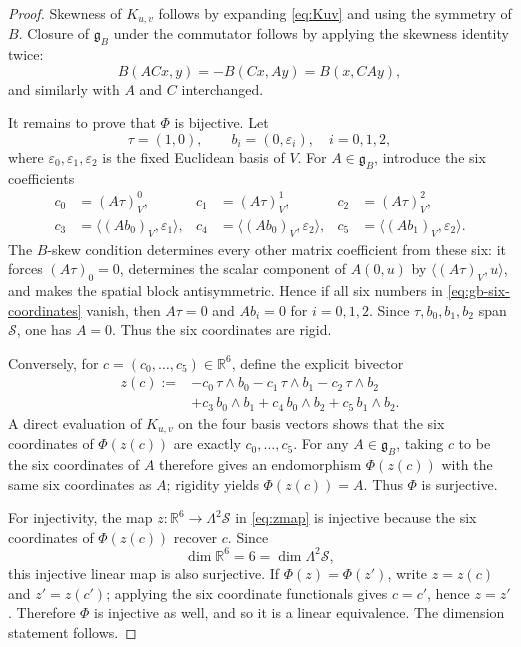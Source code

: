 \documentclass[11pt,a4paper]{article}
\theoremstyle{definition}
\theoremstyle{remark}
\newcommand{\R}{\mathbb{R}}
\newcommand{\Smodel}{\mathcal{S}}
\newcommand{\gB}{\mathfrak{g}_{B}}
\begin{document}
\begin{proof}
Skewness of \(K_{u,v}\) follows by expanding \eqref{eq:Kuv} and using the
symmetry of \(B\).  Closure of \(\gB\) under the commutator follows by
applying the skewness identity twice:
\[
  B(ACx,y)=-B(Cx,Ay)=B(x,CAy),
\]
and similarly with \(A\) and \(C\) interchanged.

It remains to prove that \(\Phi\) is bijective.  Let
\[
   \tau=(1,0),
   \qquad
   b_i=(0,\varepsilon_i),\quad i=0,1,2,
\]
where \(\varepsilon_0,\varepsilon_1,\varepsilon_2\) is the fixed Euclidean
basis of \(V\).  For \(A\in\gB\), introduce the six coefficients
\[
\begin{aligned}
   c_0&=(A\tau)_V^{0},&
   c_1&=(A\tau)_V^{1},&
   c_2&=(A\tau)_V^{2},\\
   c_3&=\langle (Ab_0)_V,\varepsilon_1\rangle,&
   c_4&=\langle (Ab_0)_V,\varepsilon_2\rangle,&
   c_5&=\langle (Ab_1)_V,\varepsilon_2\rangle.
\end{aligned}
\tag{4.6a}\label{eq:gb-six-coordinates}
\]
The \(B\)-skew condition determines every other matrix coefficient from
these six: it forces \((A\tau)_0=0\), determines the scalar component of
\(A(0,u)\) by \(\langle(A\tau)_V,u\rangle\), and makes the spatial block
antisymmetric.  Hence if all six numbers in
\eqref{eq:gb-six-coordinates} vanish, then \(A\tau=0\) and
\(Ab_i=0\) for \(i=0,1,2\).  Since \(\tau,b_0,b_1,b_2\) span
\(\Smodel\), one has \(A=0\).  Thus the six coordinates are rigid.

Conversely, for \(c=(c_0,\ldots,c_5)\in\R^6\), define the explicit
bivector
\[
\begin{aligned}
   z(c):={}&-c_0\,\tau\wedge b_0
            -c_1\,\tau\wedge b_1
            -c_2\,\tau\wedge b_2\\
          &+c_3\,b_0\wedge b_1
            +c_4\,b_0\wedge b_2
            +c_5\,b_1\wedge b_2 .
\end{aligned}
\tag{4.6b}\label{eq:zmap}
\]
A direct evaluation of \(K_{u,v}\) on the four basis vectors shows that
the six coordinates of \(\Phi(z(c))\) are exactly \(c_0,\ldots,c_5\).
For any \(A\in\gB\), taking \(c\) to be the six coordinates of \(A\)
therefore gives an endomorphism \(\Phi(z(c))\) with the same six
coordinates as \(A\); rigidity yields \(\Phi(z(c))=A\).  Thus \(\Phi\) is
surjective.

For injectivity, the map \(z:\R^6\to\Lambda^2\Smodel\) in
\eqref{eq:zmap} is injective because the six coordinates of
\(\Phi(z(c))\) recover \(c\).  Since
\[
   \dim\R^6=6=\dim\Lambda^2\Smodel,
\]
this injective linear map is also surjective.  If \(\Phi(z)=\Phi(z')\),
write \(z=z(c)\) and \(z'=z(c')\); applying the six coordinate functionals
gives \(c=c'\), hence \(z=z'\).  Therefore \(\Phi\) is injective as well,
and so it is a linear equivalence.  The dimension statement follows.
\end{proof}
\end{document}

